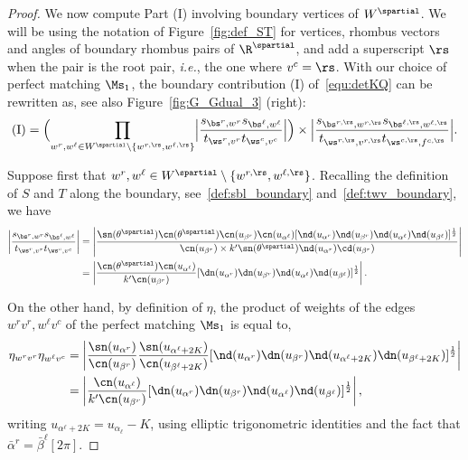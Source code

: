 \documentclass[a4paper,twoside,11pt]{article}
\begin{document}
\begin{proof}
We now compute Part (I) involving boundary vertices of $W^\spartial$.
We will be using the notation of Figure~\ref{fig:def_ST} 
for vertices, rhombus vectors and angles of boundary rhombus pairs of $\R^\spartial$, and add a superscript $\rs$ 
when the pair is the root pair, \emph{i.e.}, the one where $v^c=\rs$. With our choice of perfect matching 
$\Ms_1$, the boundary contribution (I) of~\eqref{equ:detKQ} can be rewritten as, see also Figure~\ref{fig:G_Gdual_3} (right):
\begin{equation*}
(\mathrm{I})=\Bigl(\prod_{w^r,w^\ell\in W^{\spartial}\setminus\{w^{r,\rs},w^{\ell,\rs}\}}
\Bigl|\frac{s_{\bs^r,w^r}s_{\bs^\ell,w^\ell} }{t_{\ws^r,v^r}t_{\ws^c,v^c}}\Bigr|\Bigr)\times
\Bigl|\frac{s_{\bs^{r,\rs},w^{r,\rs}}s_{\bs^{\ell,\rs},w^{\ell,\rs}}}{
t_{\ws^{r,\rs},v^{r,\rs}}t_{\ws^{c,\rs},f^{c,\rs}}}\Bigr|.
\end{equation*}

Suppose first that $w^r,w^\ell\in W^\spartial\setminus\{w^{r,\rs},w^{\ell,\rs}\}$. Recalling the definition of $S$ and $T$ along the boundary, 
see~\eqref{def:sbl_boundary} and~\eqref{def:twv_boundary}, we have
\begin{align*}
\left|\frac{s_{\bs^r,w^r}s_{\bs^\ell,w^\ell} }{t_{\ws^r,v^r}t_{\ws^c,v^c}}\right|&=
\left|\frac{\sn(\theta^\spartial)\cn(\theta^\spartial)\cn(u_{\beta^r})
\cn(u_{\alpha^\ell})[\nd(u_{\alpha^r})\nd(u_{\beta^r})\nd(u_{\alpha^\ell})\nd(u_{\beta^\ell})]^{\frac{1}{2}}
}{\cn(u_{\beta^r})\times k'\sn(\theta^\spartial)\nd(u_{\alpha^r})\cd(u_{\beta^r})}\right|\\
&=\left|
\frac{\cn(\theta^\spartial)\cn(u_{\alpha^\ell})}{k'\cn(u_{\beta^r})}
[\dn(u_{\alpha^r})\dn(u_{\beta^r})\nd(u_{\alpha^\ell})\nd(u_{\beta^\ell})]^{\frac{1}{2}}
\right|.
\end{align*}

On the other hand, by definition of $\eta$, the product of weights of the edges $w^r v^r,w^\ell v^c$ of the perfect matching $\Ms_1$ is equal to,
\begin{align*}
\eta_{w^r v^r}\eta_{w^\ell v^c}&=
\left|
\frac{\sn(u_{\alpha^r})}{\cn(u_{\beta^r})}\frac{\sn(u_{\alpha^\ell+2K})}{\cn(u_{\beta^\ell+2K})}
[\nd(u_{\alpha^r})\dn(u_{\beta^r})\nd(u_{\alpha^\ell+2K})\dn(u_{\beta^\ell+2K})]^{\frac{1}{2}}
\right|\\
&=\left|
\frac{\cn(u_{\alpha^\ell})}{k'\cn(u_{\beta^r})}
[\dn(u_{\alpha^r})\dn(u_{\beta^r})\nd(u_{\alpha^\ell})\nd(u_{\beta^\ell})]^{\frac{1}{2}}
\right|,
\end{align*}
writing $u_{\alpha^\ell+2K}=u_{\alpha_{\ell}}-K$, using elliptic trigonometric identities and the fact that $\bar{\alpha}^r=\bar{\beta}^\ell[2\pi]$.


\end{proof}
\end{document}
